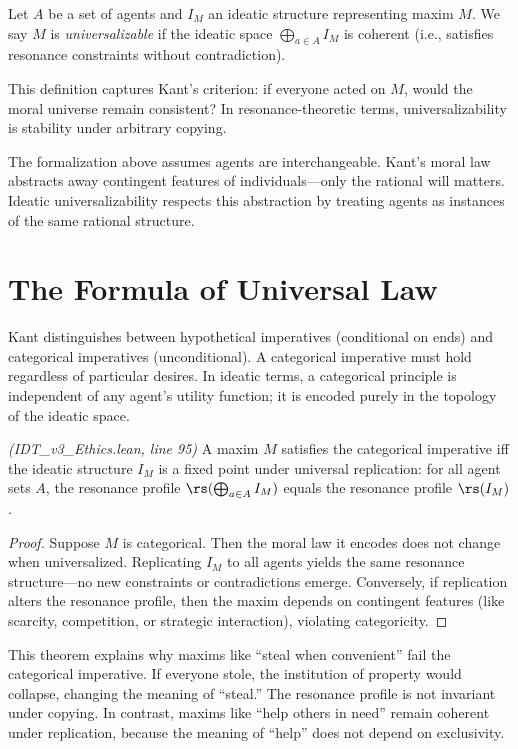 \begin{definition}
Let $A$ be a set of agents and $I_M$ an ideatic structure representing maxim $M$. We say $M$ is \emph{universalizable} if the ideatic space $\bigoplus_{a \in A} I_M$ is coherent (i.e., satisfies resonance constraints without contradiction).
\end{definition}

This definition captures Kant's criterion: if everyone acted on $M$, would the moral universe remain consistent? In resonance-theoretic terms, universalizability is stability under arbitrary copying.

\begin{remark}
The formalization above assumes agents are interchangeable. Kant's moral law abstracts away contingent features of individuals—only the rational will matters. Ideatic universalizability respects this abstraction by treating agents as instances of the same rational structure.
\end{remark}

\section{The Formula of Universal Law}

Kant distinguishes between hypothetical imperatives (conditional on ends) and categorical imperatives (unconditional). A categorical imperative must hold regardless of particular desires. In ideatic terms, a categorical principle is independent of any agent's utility function; it is encoded purely in the topology of the ideatic space.

\begin{theorem}
\textit{(IDT\_v3\_Ethics.lean, line 95)}
A maxim $M$ satisfies the categorical imperative iff the ideatic structure $I_M$ is a fixed point under universal replication: for all agent sets $A$, the resonance profile $\rs(\bigoplus_{a \in A} I_M)$ equals the resonance profile $\rs(I_M)$.
\end{theorem}

\begin{proof}
Suppose $M$ is categorical. Then the moral law it encodes does not change when universalized. Replicating $I_M$ to all agents yields the same resonance structure—no new constraints or contradictions emerge. Conversely, if replication alters the resonance profile, then the maxim depends on contingent features (like scarcity, competition, or strategic interaction), violating categoricity.
\end{proof}

\begin{interpretation}
This theorem explains why maxims like ``steal when convenient'' fail the categorical imperative. If everyone stole, the institution of property would collapse, changing the meaning of ``steal.'' The resonance profile is not invariant under copying. In contrast, maxims like ``help others in need'' remain coherent under replication, because the meaning of ``help'' does not depend on exclusivity.
\end{interpretation}
